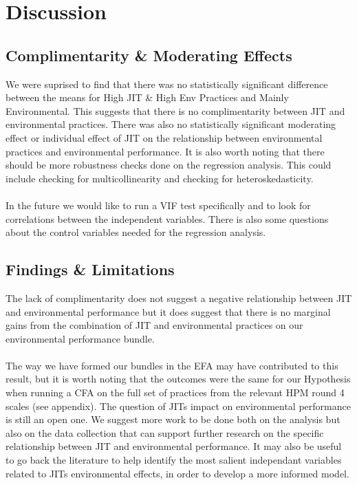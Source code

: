 \section*{Discussion}
\subsection{Complimentarity \& Moderating Effects}
We were suprised to find that there was no statistically significant difference between the means for High JIT \& High Env Practices and Mainly Environmental.
This suggests that there is no complimentarity between JIT and environmental practices.
There was also no statistically significant moderating effect or individual effect of JIT on the relationship between environmental practices and environmental performance.
It is also worth noting that there should be more robustness checks done on the regression analysis.
This could include checking for multicollinearity and checking for heteroskedasticity.
\\
\\
In the future we would like to run a VIF test specifically and to look for correlations between the independent variables.
There is also some questions about the control variables needed for the regression analysis. 
\subsection{Findings \& Limitations}
The lack of complimentarity does not suggest a negative relationship between JIT and environmental performance but it does suggest that there is no marginal gains from the combination of JIT and environmental practices on our environmental performance bundle.
\\
\\
The way we have formed our bundles in the EFA may have contributed to this result, but it is worth noting that the outcomes were the same for our Hypothesis when running a CFA on the full set of practices from the relevant HPM round 4 scales (see appendix).
The question of JITs impact on environmental performance is still an open one.
We suggest more work to be done both on the analysis but also on the data collection that can support further research on the specific relationship between JIT and environmental performance.
It may also be useful to go back the literature to help identify the most salient independant variables related to JITs environmental effects, in order to develop a more informed model.